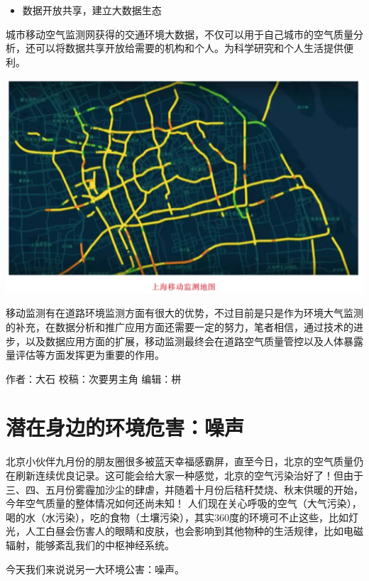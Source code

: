 \documentclass[]{book}
\providecommand{\tightlist}{%
  \setlength{\itemsep}{0pt}\setlength{\parskip}{0pt}}
\begin{document}
\begin{itemize}
\tightlist
\item
  数据开放共享，建立大数据生态
\end{itemize}

城市移动空气监测网获得的交通环境大数据，不仅可以用于自己城市的空气质量分析，还可以将数据共享开放给需要的机构和个人。为科学研究和个人生活提供便利。

\includegraphics[width=6.67in]{images/dlyd5}

移动监测有在道路环境监测方面有很大的优势，不过目前是只是作为环境大气监测的补充，在数据分析和推广应用方面还需要一定的努力，笔者相信，通过技术的进步，以及数据应用方面的扩展，移动监测最终会在道路空气质量管控以及人体暴露量评估等方面发挥更为重要的作用。

作者：大石
校稿：次要男主角
编辑：栟

\hypertarget{ux6f5cux5728ux8eabux8fb9ux7684ux73afux5883ux5371ux5bb3ux566aux58f0}{%
\section{潜在身边的环境危害：噪声}\label{ux6f5cux5728ux8eabux8fb9ux7684ux73afux5883ux5371ux5bb3ux566aux58f0}}

北京小伙伴九月份的朋友圈很多被蓝天幸福感霸屏，直至今日，北京的空气质量仍在刷新连续优良记录。这可能会给大家一种感觉，北京的空气污染治好了！但由于三、四、五月份雾霾加沙尘的肆虐，并随着十月份后秸秆焚烧、秋末供暖的开始，今年空气质量的整体情况如何还尚未知！
人们现在关心呼吸的空气（大气污染），喝的水（水污染），吃的食物（土壤污染），其实360度的环境可不止这些，比如灯光，人工白昼会伤害人的眼睛和皮肤，也会影响到其他物种的生活规律，比如电磁辐射，能够紊乱我们的中枢神经系统。

今天我们来说说另一大环境公害：噪声。
\end{document}
